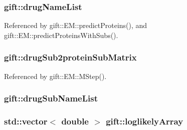 \subsubsection[{\texorpdfstring{drug\+Name\+List}{drugNameList}}]{ gift\+::drug\+Name\+List}\hypertarget{namespacegift_a8ace6c6707676ba4866203d5ddc0a02e}{}\label{namespacegift_a8ace6c6707676ba4866203d5ddc0a02e}


Referenced by gift\+::\+E\+M\+::predict\+Proteins(), and gift\+::\+E\+M\+::predict\+Proteins\+With\+Subs().

\subsubsection[{\texorpdfstring{drug\+Sub2protein\+Sub\+Matrix}{drugSub2proteinSubMatrix}}]{ gift\+::drug\+Sub2protein\+Sub\+Matrix}\hypertarget{namespacegift_ae49d782c144d39543cd6504f5e7d9c7a}{}\label{namespacegift_ae49d782c144d39543cd6504f5e7d9c7a}


Referenced by gift\+::\+E\+M\+::\+M\+Step().

\subsubsection[{\texorpdfstring{drug\+Sub\+Name\+List}{drugSubNameList}}]{ gift\+::drug\+Sub\+Name\+List}\hypertarget{namespacegift_afacd45b62c4abab4c029c7b0e82a149c}{}\label{namespacegift_afacd45b62c4abab4c029c7b0e82a149c}
\subsubsection[{\texorpdfstring{loglikely\+Array}{loglikelyArray}}]{\setlength{\rightskip}{0pt plus 5cm}std\+::vector$<$ double $>$ gift\+::loglikely\+Array}\hypertarget{namespacegift_ac31667d9b67b35a70ac9d46dfe6a7967}{}\label{namespacegift_ac31667d9b67b35a70ac9d46dfe6a7967}


